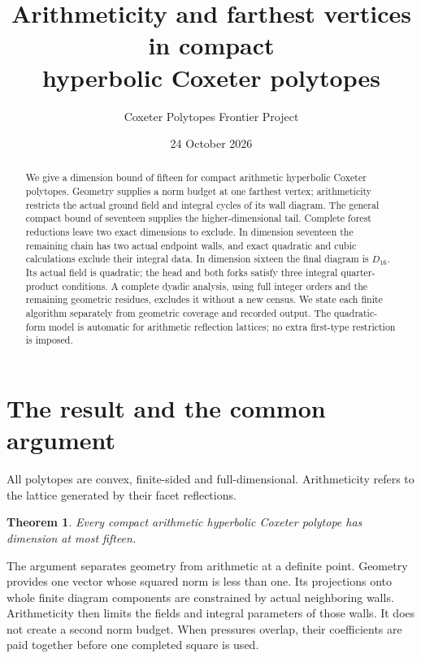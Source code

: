 \documentclass[11pt]{article}
\title{Arithmeticity and farthest vertices in compact\\
hyperbolic Coxeter polytopes}
\author{Coxeter Polytopes Frontier Project}
\date{24 October 2026}
\newtheorem{theorem}{Theorem}
\begin{document}
\maketitle
\begin{abstract}
We give a dimension bound of fifteen for compact arithmetic hyperbolic
Coxeter polytopes. Geometry supplies a norm budget at one farthest
vertex; arithmeticity restricts the actual ground field and integral
cycles of its wall diagram. The general compact bound of seventeen
supplies the higher-dimensional tail. Complete forest reductions leave
two exact dimensions to exclude. In dimension seventeen the remaining
chain has two actual endpoint walls, and exact quadratic and cubic
calculations exclude their integral data. In dimension sixteen the
final diagram is $D_{16}$. Its actual field is quadratic; the head and
both forks satisfy three integral quarter-product conditions.
A complete dyadic analysis, using full integer orders and the remaining
geometric residues, excludes it without a new census. We state each
finite algorithm separately from geometric coverage and recorded output.
The quadratic-form model is automatic for arithmetic reflection
lattices; no extra first-type restriction is imposed.
\end{abstract}

\setcounter{tocdepth}{1}
\tableofcontents

\section{The result and the common argument}\label{sec:scope}

All polytopes are convex, finite-sided and full-dimensional.
Arithmeticity refers to the lattice generated by their facet reflections.

\begin{theorem}\label{thm:main}
Every compact arithmetic hyperbolic Coxeter polytope has dimension at
most fifteen.
\end{theorem}

The argument separates geometry from arithmetic at a definite point.
Geometry provides one vector whose squared norm is less than one.
Its projections onto whole finite diagram components are constrained
by actual neighboring walls. Arithmeticity then limits the fields and
integral parameters of those walls. It does not create a second norm
budget. When pressures overlap, their coefficients are paid together
before one completed square is used.
\end{document}
